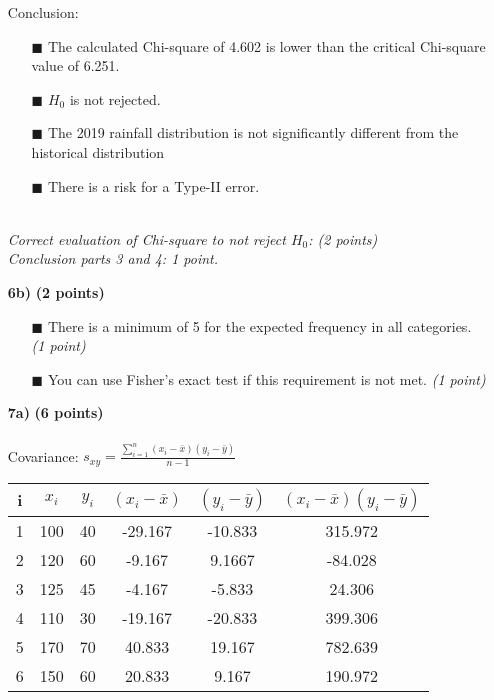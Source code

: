 \begin{itemize}
    Conclusion: 
    \begin{itemize}
        \item[$\blacksquare$] The calculated Chi-square of 4.602 is lower than the critical Chi-square value of 6.251.
        \item[$\blacksquare$] $H_0$ is not rejected.
        \item[$\blacksquare$] The 2019 rainfall distribution is not significantly different from the historical distribution 
        \item[$\blacksquare$] There is a risk for a Type-II error.
    \end{itemize} \\
    \textit{Correct evaluation of Chi-square to not reject $H_0$: (2 points) \\ Conclusion parts 3 and 4: 1 point.} \\
\item[\textbf{6b)}] \textbf{(2 points)} \\
    \begin{itemize}
        \item[$\blacksquare$] There is a minimum of 5 for the expected frequency in all categories. \textit{(1 point)}
        \item[$\blacksquare$] You can use Fisher’s exact test if this requirement is not met. \textit{(1 point)}
        \end{itemize}
\item[\textbf{7a)}] \textbf{(6 points)} \\ \\ 
Covariance: $s_{xy} = \frac{\sum_{i=1}^n (x_i - \bar{x}) (y_i - \bar{y})}{n - 1}$
 \begin{center}
    \begin{tabular}{|c|c|c|c|c|c|}
    \hline
    i & $x_i$ & $y_i$ & $(x_i - \bar{x})$ & $(y_i - \bar{y})$ & $(x_i - \bar{x}) (y_i - \bar{y})$ \tstrut\bstrut\\
    \hline
    1 & 100 & 40 & -29.167 & -10.833 & 315.972 \tstrut\bstrut\\
    \hline
    2 & 120 & 60 & -9.167 & 9.1667 & -84.028 \tstrut\bstrut\\
    \hline
    3 & 125 & 45 & -4.167 & -5.833 & 24.306 \tstrut\bstrut\\
    \hline
    4 & 110 & 30 & -19.167 & -20.833 & 399.306 \tstrut\bstrut\\
    \hline
    5 & 170 & 70 & 40.833 & 19.167 & 782.639 \tstrut\bstrut\\
    \hline
    6 & 150 & 60 & 20.833 & 9.167 & 190.972 \tstrut\bstrut\\

\end{tabular}
\end{center}
\end{itemize}
